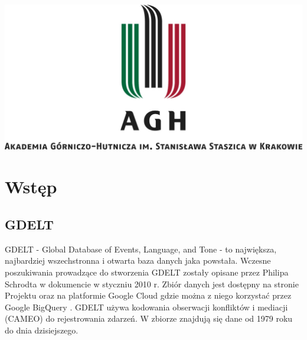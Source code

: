 \documentclass[11pt]{report}
\begin{document}
 \begin{titlepage}
 \centering
\includegraphics[width=0.8 \textwidth]{fig/AGH.jpg}
 \vspace{0.03\textheight}
 \bigskip
 \vspace{0.2\textheight}
 \par

 \vspace{0.1\textheight}
 \end{titlepage}


 \tableofcontents


 \chapter{Wstęp}
 
 \section{GDELT}
 GDELT - Global Database of Events, Language, and Tone - to największa, najbardziej wszechstronna i otwarta baza danych jaka powstała. Wczesne poszukiwania prowadzące do stworzenia GDELT zostały opisane przez Philipa Schrodta w dokumencie \cite{Schrodt2010} w styczniu 2010 r. Zbiór danych jest dostępny na stronie Projektu oraz na platformie Google Cloud gdzie można z niego korzystać przez Google BigQuery \cite{BigQuery2014}. GDELT używa kodowania obserwacji konfliktów i mediacji (CAMEO) \cite{GDELTDocumentation} do rejestrowania zdarzeń. W zbiorze znajdują się dane od 1979 roku do dnia dzisiejszego. 
\end{document}
